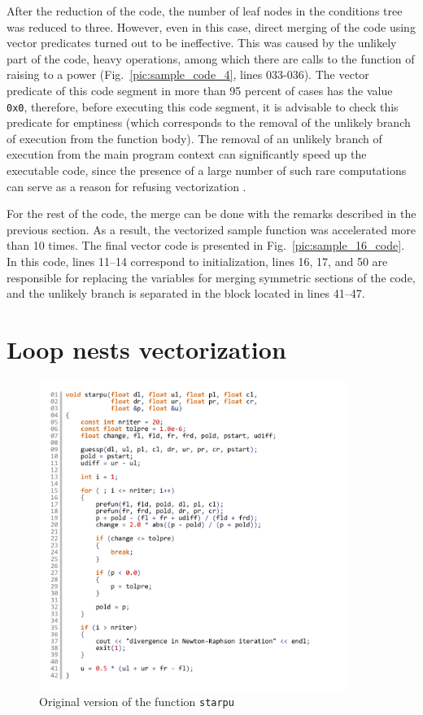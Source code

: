 \documentclass[utf8,english]{psta}%
\begin{document}
After the reduction of the code, the number of leaf nodes in the conditions tree was reduced to three.
However, even in this case, direct merging of the code using vector predicates turned out to be ineffective.
This was caused by the unlikely part of the code, heavy operations, among which there are calls to the function of raising to a power (Fig.~\ref{pic:sample_code_4}, lines 033-036).
The vector predicate of this code segment in more than 95 percent of cases has the value \texttt{0x0}, therefore, before executing this code segment, it is advisable to check this predicate for emptiness (which corresponds to the removal of the unlikely branch of execution from the function body).
The removal of an unlikely branch of execution from the main program context can significantly speed up the executable code, since the presence of a large number of such rare computations can serve as a reason for refusing vectorization \cite{RybLowProb}.

For the rest of the code, the merge can be done with the remarks described in the previous section.
As a result, the vectorized sample function was accelerated more than 10 times.
The final vector code is presented in Fig.~\ref{pic:sample_16_code}.
In this code, lines 11–14 correspond to initialization, lines 16, 17, and 50 are responsible for replacing the variables for merging symmetric sections of the code, and the unlikely branch is separated in the block located in lines 41–47.

\section{Loop nests vectorization}

\begin{figure}
\includegraphics[width=10cm]{pics/pic_starpu_code}
\caption{Original version of the function \texttt{starpu}}
\label{pic:starpu_code}
\end{figure}
\end{document}
